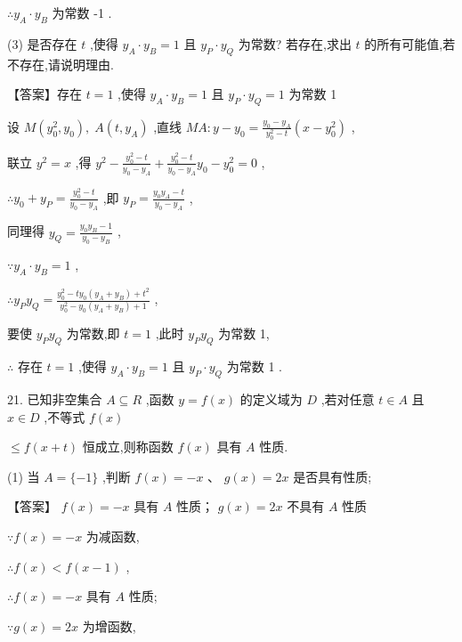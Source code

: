 \documentclass[10pt]{article}
\begin{document}
\(\therefore {y}_{A} \cdot  {y}_{B}\) 为常数 -1 .

(3) 是否存在 \(t\) ,使得 \({y}_{A} \cdot  {y}_{B} = 1\) 且 \({y}_{P} \cdot  {y}_{Q}\) 为常数? 若存在,求出 \(t\) 的所有可能值,若不存在,请说明理由.

【答案】存在 \(t = 1\) ,使得 \({y}_{A} \cdot  {y}_{B} = 1\) 且 \({y}_{P} \cdot  {y}_{Q} = 1\) 为常数 1

设 \(M\left( {{y}_{0}^{2},{y}_{0}}\right) ,\;A\left( {t,{y}_{A}}\right)\) ,直线 \({MA} : y - {y}_{0} = \frac{{y}_{0} - {y}_{A}}{{y}_{0}^{2} - t}\left( {x - {y}_{0}^{2}}\right)\) ,

联立 \({y}^{2} = x\) ,得 \({y}^{2} - \frac{{y}_{0}^{2} - t}{{y}_{0} - {y}_{A}} + \frac{{y}_{0}^{2} - t}{{y}_{0} - {y}_{A}}{y}_{0} - {y}_{0}^{2} = 0\) ,

\(\therefore {y}_{0} + {y}_{P} = \frac{{y}_{0}^{2} - t}{{y}_{0} - {y}_{A}}\) ,即 \({y}_{P} = \frac{{y}_{0}{y}_{A} - t}{{y}_{0} - {y}_{A}}\) ,

同理得 \({y}_{Q} = \frac{{y}_{0}{y}_{B} - 1}{{y}_{0} - {y}_{B}}\) ,

\(\because {y}_{A} \cdot  {y}_{B} = 1\) ,

\(\therefore {y}_{P}{y}_{Q} = \frac{{y}_{0}^{2} - t{y}_{0}\left( {{y}_{A} + {y}_{B}}\right)  + {t}^{2}}{{y}_{0}^{2} - {y}_{0}\left( {{y}_{A} + {y}_{B}}\right)  + 1}\) ,

要使 \({y}_{P}{y}_{Q}\) 为常数,即 \(t = 1\) ,此时 \({y}_{P}{y}_{Q}\) 为常数 1,

\(\therefore\) 存在 \(t = 1\) ,使得 \({y}_{A} \cdot  {y}_{B} = 1\) 且 \({y}_{P} \cdot  {y}_{Q}\) 为常数 1 .

21. 已知非空集合 \(A \subseteq  R\) ,函数 \(y = f\left( x\right)\) 的定义域为 \(D\) ,若对任意 \(t \in  A\) 且 \(x \in  D\) ,不等式 \(f\left( x\right)\)

\(\leq  f\left( {x + t}\right)\) 恒成立,则称函数 \(f\left( x\right)\) 具有 \(A\) 性质.

(1) 当 \(A = \{  - 1\}\) ,判断 \(f\left( x\right)  =  - x\text{ 、 }g\left( x\right)  = {2x}\) 是否具有性质;

【答案】 \(f\left( x\right)  =  - x\) 具有 \(A\) 性质； \(g\left( x\right)  = {2x}\) 不具有 \(A\) 性质

\(\because f\left( x\right)  =  - x\) 为减函数,

\(\therefore f\left( x\right)  < f\left( {x - 1}\right)\) ,

\(\therefore f\left( x\right)  =  - x\) 具有 \(A\) 性质;

\(\because g\left( x\right)  = {2x}\) 为增函数,
\end{document}
